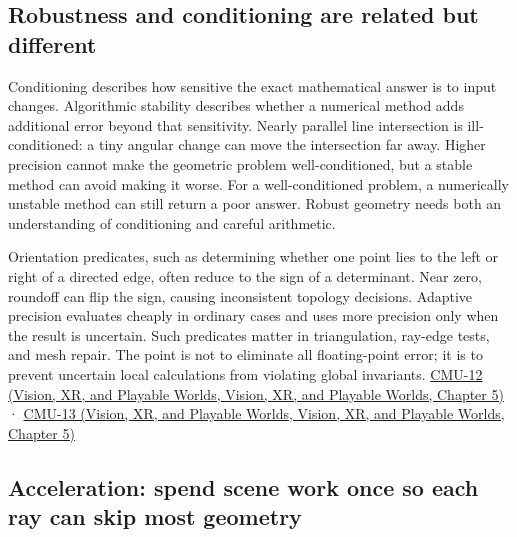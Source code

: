 \subsection{Robustness and conditioning are related but different}\label{04-visual-computing-ii-ch029-robustness-and-conditioning-are-related-but-different}

Conditioning describes how sensitive the exact mathematical answer is to input changes. Algorithmic stability describes whether a numerical method adds additional error beyond that sensitivity. Nearly parallel line intersection is ill-conditioned: a tiny angular change can move the intersection far away. Higher precision cannot make the geometric problem well-conditioned, but a stable method can avoid making it worse. For a well-conditioned problem, a numerically unstable method can still return a poor answer. Robust geometry needs both an understanding of conditioning and careful arithmetic.

Orientation predicates, such as determining whether one point lies to the left or right of a directed edge, often reduce to the sign of a determinant. Near zero, roundoff can flip the sign, causing inconsistent topology decisions. Adaptive precision evaluates cheaply in ordinary cases and uses more precision only when the result is uncertain. Such predicates matter in triangulation, ray-edge tests, and mesh repair. The point is not to eliminate all floating-point error; it is to prevent uncertain local calculations from violating global invariants. \href{../07-Vision-XR-and-Playable-Worlds/main.pdf\#nameddest=04-visual-computing-ii-ch036-cmu-12---geometric-queries}{CMU-12 (Vision, XR, and Playable Worlds, Vision, XR, and Playable Worlds, Chapter 5)} · \href{../07-Vision-XR-and-Playable-Worlds/main.pdf\#nameddest=04-visual-computing-ii-ch036-cmu-13---spatial-data-structures}{CMU-13 (Vision, XR, and Playable Worlds, Vision, XR, and Playable Worlds, Chapter 5)}

\subsection{Acceleration: spend scene work once so each ray can skip most geometry}\label{04-visual-computing-ii-ch029-acceleration-spend-scene-work-once-so-each-ray-can-skip-most-geometry}


